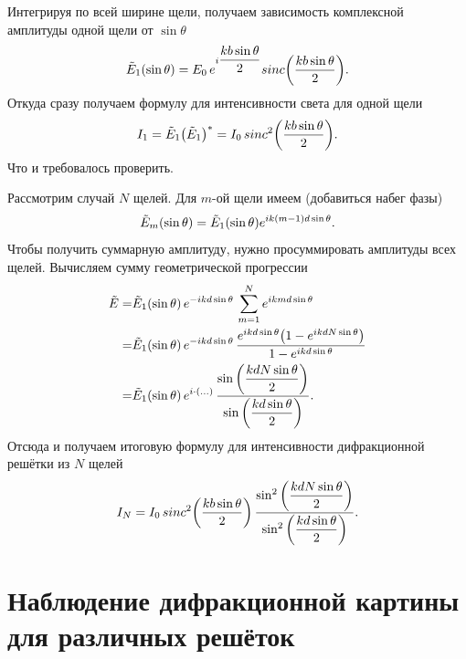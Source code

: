 \documentclass[12pt]{article}
\begin{document}
	Интегрируя по всей ширине щели, получаем зависимость комплексной амплитуды одной щели от $\sin{\theta}$
	\begin{equation}
		\tilde{E}_1\qty(\sin{\theta}) = E_0\, e^{i\dfrac{kb\sin{\theta}}{2}} sinc\qty(\dfrac{kb\sin{\theta}}{2}).
	\end{equation}
	Откуда сразу получаем формулу для интенсивности света для одной щели
	\begin{equation}
		I_1 = \tilde{E}_1 \qty(\tilde{E}_1)^* = I_0\, sinc^2\qty(\dfrac{kb\sin{\theta}}{2}).
	\end{equation}
	Что и требовалось проверить. 
	\par Рассмотрим случай $N$ щелей. Для $m$\--ой щели имеем (добавиться набег фазы)
	\begin{equation}
		\tilde{E}_m\qty(\sin{\theta}) = \tilde{E}_1\qty(\sin{\theta}) e^{ik(m-1)d\sin{\theta}}.
	\end{equation}
	Чтобы получить суммарную амплитуду, нужно просуммировать амплитуды всех щелей. Вычисляем сумму геометрической прогрессии
	\begin{equation}
	\begin{split}
		\tilde{E} =& \tilde{E}_1\qty(\sin{\theta})\, e^{-ikd\sin{\theta}}\, \sum_{m=1}^{N} e^{ikmd\sin{\theta}}\\
		=&\tilde{E}_1\qty(\sin{\theta})\, e^{-ikd\sin{\theta}}\, \dfrac{e^{ikd\sin{\theta}}\qty(1 - e^{ikdN\sin{\theta}})}{1-e^{ikd\sin{\theta}}}\\
		=&\tilde{E}_1\qty(\sin{\theta})\, e^{i\cdot (...)}\, \dfrac{\sin\qty(\dfrac{kdN\sin{\theta}}{2})}{\sin\qty(\dfrac{kd\sin{\theta}}{2})}.
	\end{split}
	\end{equation}
	Отсюда и получаем итоговую формулу для интенсивности дифракционной решётки из $N$ щелей
	\begin{equation}
		I_N =  I_0\, sinc^2\qty(\dfrac{kb\sin{\theta}}{2})\, \dfrac{\sin^2\qty(\dfrac{kdN\sin{\theta}}{2})}{\sin^2\qty(\dfrac{kd\sin{\theta}}{2})}.
	\end{equation}

	\section{Наблюдение дифракционной картины для различных решёток}
\end{document}
